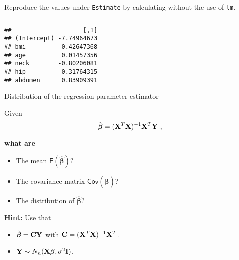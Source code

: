 \documentclass[10pt,ignorenonframetext,]{beamer}
\newenvironment{Shaded}{\begin{snugshade}}{\end{snugshade}}
\newcommand{\KeywordTok}[1]{\textcolor[rgb]{0.13,0.29,0.53}{\textbf{#1}}}
\newcommand{\NormalTok}[1]{#1}
\newcommand{\OperatorTok}[1]{\textcolor[rgb]{0.81,0.36,0.00}{\textbf{#1}}}
\newcommand{\StringTok}[1]{\textcolor[rgb]{0.31,0.60,0.02}{#1}}
\providecommand{\tightlist}{%
  \setlength{\itemsep}{0pt}\setlength{\parskip}{0pt}}
\begin{document}
\begin{frame}[fragile]

Reproduce the values under \texttt{Estimate} by calculating without the
use of \texttt{lm}.

\(~\)

\scriptsize

\begin{Shaded}
\end{Shaded}

\begin{verbatim}
##                    [,1]
## (Intercept) -7.74964673
## bmi          0.42647368
## age          0.01457356
## neck        -0.80206081
## hip         -0.31764315
## abdomen      0.83909391
\end{verbatim}

\end{frame}

\begin{frame}

\begin{block}{Distribution of the regression parameter estimator}

\vspace{2mm}

Given
\[ \hat{\boldsymbol\beta}=({\bf X}^T{\bf X})^{-1} {\bf X}^T {\bf Y} \ ,\]

\textbf{what are}

\begin{itemize}
\tightlist
\item
  The mean \(\mathsf{E}(\hat{\boldsymbol\beta})\)?
\item
  The covariance matrix \(\mathsf{Cov}(\hat{\boldsymbol\beta})\)?
\item
  The distribution of \(\hat{\boldsymbol\beta}\)?
\end{itemize}

\vspace{4mm}

\textbf{Hint:} Use that

\begin{itemize}
\tightlist
\item
  \(\hat{\boldsymbol\beta}={\bf C}{\bf Y}\) with
  \({\bf C}=({\bf X}^T{\bf X})^{-1} {\bf X}^T\).
\item
  \({\bf Y} \sim N_{n}({\bf X} {\boldsymbol\beta},\sigma^2 {\bf I})\).
\end{itemize}

\end{block}

\end{frame}
\end{document}
